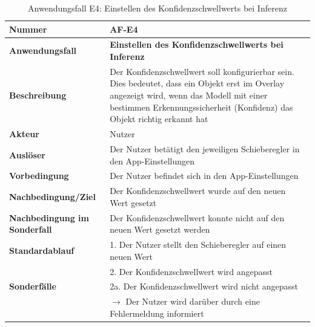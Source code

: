 \documentclass[oneside]{ausarbeitung}
\begin{document}
\begin{table}[htbp]
	\centering
	\begin{tabular}{|l|p{80mm}|}
		\hline
		\textbf{Nummer} & \textbf{AF-E4} \\ \hline
		\textbf{Anwendungsfall} & \textbf{Einstellen des Konfidenzschwellwerts bei Inferenz} \\ \hline
		\textbf{Beschreibung} & Der Konfidenzschwellwert soll konfigurierbar sein. Dies bedeutet, dass ein Objekt erst im Overlay angezeigt wird, wenn das Modell mit einer bestimmen Erkennungssicherheit (Konfidenz) das Objekt richtig erkannt hat \\ \hline
		\textbf{Akteur} & Nutzer \\ \hline
		\textbf{Auslöser} & Der Nutzer betätigt den jeweiligen Schieberegler in den App-Einstellungen \\ \hline
		\textbf{Vorbedingung} & Der Nutzer befindet sich in den App-Einstellungen \\ \hline	
		\textbf{Nachbedingung/Ziel} & Der Konfidenzschwellwert wurde auf den neuen Wert gesetzt \\ \hline
		\textbf{Nachbedingung im Sonderfall} & Der Konfidenzschwellwert konnte nicht auf den neuen Wert gesetzt werden \\ \hline
		\textbf{Standardablauf} & 1. Der Nutzer stellt den Schieberegler auf einen neuen Wert \\ 
		& 2. Der Konfidenzschwellwert wird angepasst \\ \hline
		\textbf{Sonderfälle} & 2a. Der Konfidenzschwellwert wird nicht angepasst \\ 
		& $\rightarrow$ Der Nutzer wird darüber durch eine Fehlermeldung informiert \\ \hline
		
	\end{tabular}
	\caption{Anwendungsfall E4: Einstellen des Konfidenzschwellwerts bei Inferenz}
	\label{tab:use-case-set-conf-thres}
\end{table}
\end{document}
